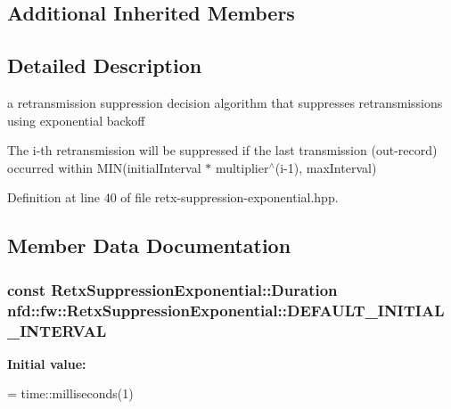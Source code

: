 \subsection*{Additional Inherited Members}


\subsection{Detailed Description}
a retransmission suppression decision algorithm that suppresses retransmissions using exponential backoff 

The i-\/th retransmission will be suppressed if the last transmission (out-\/record) occurred within M\+IN(initial\+Interval $\ast$ multiplier$^\wedge$(i-\/1), max\+Interval) 

Definition at line 40 of file retx-\/suppression-\/exponential.\+hpp.



\subsection{Member Data Documentation}
\subsubsection[{\texorpdfstring{D\+E\+F\+A\+U\+L\+T\+\_\+\+I\+N\+I\+T\+I\+A\+L\+\_\+\+I\+N\+T\+E\+R\+V\+AL}{DEFAULT\_INITIAL\_INTERVAL}}]{\setlength{\rightskip}{0pt plus 5cm}const {\bf Retx\+Suppression\+Exponential\+::\+Duration} nfd\+::fw\+::\+Retx\+Suppression\+Exponential\+::\+D\+E\+F\+A\+U\+L\+T\+\_\+\+I\+N\+I\+T\+I\+A\+L\+\_\+\+I\+N\+T\+E\+R\+V\+AL\hspace{0.3cm}{\ttfamily [static]}}\hypertarget{classnfd_1_1fw_1_1RetxSuppressionExponential_a66f15d5d071b7f42358ac75fc4436fc0}{}\label{classnfd_1_1fw_1_1RetxSuppressionExponential_a66f15d5d071b7f42358ac75fc4436fc0}
{\bfseries Initial value\+:}
\begin{DoxyCode}
=
    time::milliseconds(1)
\end{DoxyCode}


